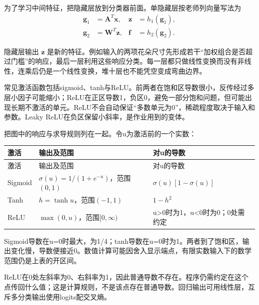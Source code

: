 为了学习中间特征，把隐藏层放到分类器前面。单隐藏层按老师列向量写法为
\[
\begin{aligned}\mathbf g_1&=\mathbf A^T\mathbf x,&\mathbf z&=h_1(\mathbf g_1),\\[3pt]
\mathbf g_2&=\mathbf W^T\mathbf z,&\mathbf f&=h_2(\mathbf g_2).\end{aligned}\tag{5.7}
\]


隐藏层输出 \(\mathbf z\) 是新的特征。例如输入的两项花朵尺寸先形成若干“加权组合是否超过门槛”的响应，最后一层利用这些响应分类。每一层都只做线性变换而没有非线性，连乘后仍是一个线性变换，堆十层也不能凭空变成弯曲边界。


常见激活函数包括sigmoid、tanh与ReLU。前两者在饱和区导数很小，反传经过多层小因子可能缩小；ReLU在正区导数1，负区0，避免一部分饱和问题，但可能出现长期不激活的单元。ReLU不会自动保证“多数单元为0”，稀疏程度取决于输入和参数。Leaky ReLU在负区保留小斜率，是作业用到的变体。


把图中的响应与求导规则列在一起。令u为激活前的一个实数：


\begingroup
\small\setlength{\tabcolsep}{3pt}
\renewcommand{\arraystretch}{1.22}
\begin{longtable}{@{}>{\raggedright\arraybackslash}p{}>{\raggedright\arraybackslash}p{}>{\raggedright\arraybackslash}p{}@{}}
\toprule
激活 & 输出及范围 & 对u的导数 \\
\midrule\endfirsthead
激活 & 输出及范围 & 对u的导数 \\
\midrule\endhead
\bottomrule\endfoot
Sigmoid & \(\sigma(u)=1/(1+e^{-u})\)，范围\((0,1)\) & \(\sigma(u)[1-\sigma(u)]\) \\
Tanh & \(h=\tanh u\)，范围\((-1,1)\) & \(1-h^2\) \\
ReLU & \(\max(0,u)\)，范围\([0,\infty)\) & u>0时为1，u<0时为0；0处需约定 \\
\end{longtable}
\endgroup


Sigmoid导数在u=0时最大，为1/4；tanh导数在u=0时为1。两者到了饱和区，输出变化慢，导数便接近0。数值计算可能因舍入显示端点，有限实数输入下的数学范围仍是上表的开区间。




ReLU在0处左斜率为0、右斜率为1，因此普通导数不存在。程序仍需约定在这个点传回什么值；这是计算规则，不是该点存在普通导数。回归输出可用线性层，互斥多分类输出使用logits配交叉熵。


